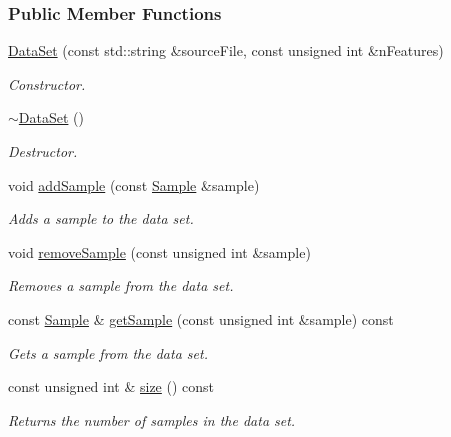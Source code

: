 \subsubsection*{Public Member Functions}
\begin{CompactItemize}
\item 
\hyperlink{class_data_set_ffb28bf240421998cd5470f594a6bb22}{DataSet} (const std::string \&sourceFile, const unsigned int \&nFeatures)
\begin{CompactList}\small\item\em Constructor. \item\end{CompactList}\item 
\hyperlink{class_data_set_2cdb84d32331956b413ca36933e516bd}{$\sim$DataSet} ()
\begin{CompactList}\small\item\em Destructor. \item\end{CompactList}\item 
void \hyperlink{class_data_set_73b646f0b40545eaf7bbe72418a0ed51}{addSample} (const \hyperlink{class_data_set_7563096ce4847d88411ed3f6ad331310}{Sample} \&sample)
\begin{CompactList}\small\item\em Adds a sample to the data set. \item\end{CompactList}\item 
void \hyperlink{class_data_set_3bf06a1621c192660336318dd523603f}{removeSample} (const unsigned int \&sample)
\begin{CompactList}\small\item\em Removes a sample from the data set. \item\end{CompactList}\item 
const \hyperlink{class_data_set_7563096ce4847d88411ed3f6ad331310}{Sample} \& \hyperlink{class_data_set_73dcd4309ecf1dbc2bcb0ba861077ac5}{getSample} (const unsigned int \&sample) const 
\begin{CompactList}\small\item\em Gets a sample from the data set. \item\end{CompactList}\item 
const unsigned int \& \hyperlink{class_data_set_805d7628a3ee31a4d4278deba91c0bbf}{size} () const 
\begin{CompactList}\small\item\em Returns the number of samples in the data set. \item\end{CompactList}\item 

\end{CompactItemize}
